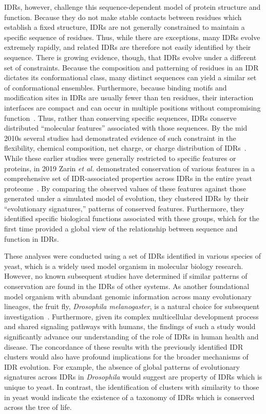 IDRs, however, challenge this sequence-dependent model of protein structure and function. Because they do not make stable contacts between residues which establish a fixed structure, IDRs are not generally constrained to maintain a specific sequence of residues. Thus, while there are exceptions, many IDRs evolve extremely rapidly, and related IDRs are therefore not easily identified by their sequence. There is growing evidence, though, that IDRs evolve under a different set of constraints. Because the composition and patterning of residues in an IDR dictates its conformational class, many distinct sequences can yield a similar set of conformational ensembles. Furthermore, because binding motifs and modification sites in IDRs are usually fewer than ten residues, their interaction interfaces are compact and can occur in multiple positions without compromising function~\cite{Tompa2014}. Thus, rather than conserving specific sequences, IDRs conserve distributed ``molecular features'' associated with those sequences. By the mid 2010s several studies had demonstrated evidence of such constraint in the flexibility, chemical composition, net charge, or charge distribution of IDRs~\cite{Daughdrill2007, Moesa2012, Zarin2017, Beh2012}. While these earlier studies were generally restricted to specific features or proteins, in 2019 Zarin \textit{et al.} demonstrated conservation of various features in a comprehensive set of IDR-associated properties across IDRs in the entire yeast proteome~\cite{Zarin2019}. By comparing the observed values of these features against those generated under a simulated model of evolution, they clustered IDRs by their ``evolutionary signatures,''  patterns of conserved features. Furthermore, they identified specific biological functions associated with these groups, which for the first time provided a global view of the relationship between sequence and function in IDRs.

These analyses were conducted using a set of IDRs identified in various species of yeast, which is a widely used model organism in molecular biology research. However, no known subsequent studies have determined if similar patterns of conservation are found in the IDRs of other systems. As another foundational model organism with abundant genomic information across many evolutionary lineages, the fruit fly, \textit{Drosophila melanogaster}, is a natural choice for subsequent investigation~\cite{Yang2018, Miller2018, Kim2021}. Furthermore, given its complex multicellular development process and shared signaling pathways with humans, the findings of such a study would significantly advance our understanding of the role of IDRs in human health and disease. The concordance of these results with the previously identified IDR clusters would also have profound implications for the broader mechanisms of IDR evolution. For example, the absence of global patterns of evolutionary signatures across IDRs in \textit{Drosophila} would suggest are property of IDRs which is unique to yeast. In contrast, the identification of clusters with similarity to those in yeast would indicate the existence of a taxonomy of IDRs which is conserved across the tree of life.

